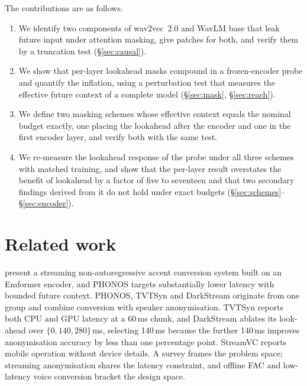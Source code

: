 \documentclass[preprint,12pt,authoryear]{elsarticle}
\begin{document}
The contributions are as follows.
\begin{enumerate}\itemsep1pt
\item We identify two components of wav2vec~2.0 and WavLM base that leak future
      input under attention masking, give patches for both, and verify them by
      a truncation test (\S\ref{sec:causal}).
\item We show that per-layer lookahead masks compound in a frozen-encoder
      probe and quantify the inflation, using a perturbation test that
      measures the effective future context of a complete model
      (\S\ref{sec:mask}, \S\ref{sec:reach}).
\item We define two masking schemes whose effective context equals the
      nominal budget exactly, one placing the lookahead after the encoder and
      one in the first encoder layer, and verify both with the same test.
\item We re-measure the lookahead response of the probe under all three
      schemes with matched training, and show that the per-layer result
      overstates the benefit of lookahead by a factor of five to seventeen
      and that two secondary findings derived from it do not hold under exact
      budgets (\S\ref{sec:schemes}--\S\ref{sec:encoder}).
\end{enumerate}

\section{Related work}

\citet{nguyen2025streaming} present a streaming
non-autoregressive accent conversion system built on an Emformer encoder, and
PHONOS \citep{phonos2026} targets substantially lower latency with bounded
future context. PHONOS, TVTSyn \citep{tvtsyn2026} and
DarkStream \citep{darkstream2025} originate from one group and combine
conversion with speaker anonymisation. TVTSyn reports both CPU and GPU latency
at a 60\,ms chunk, and DarkStream ablates its look-ahead over
$\{0, 140, 280\}$\,ms, selecting 140\,ms because the further 140\,ms improves
anonymisation accuracy by less than one percentage point.
StreamVC \citep{streamvc2024} reports mobile operation without device details.
A survey \citep{acsurvey2026} frames the problem space; streaming
anonymisation \citep{streamvoiceanon2026, streamvoiceanonplus2026, e2eanon2024}
shares the latency constraint, and offline FAC \citep{zhao2021fac,
accentron2022} and low-latency voice conversion \citep{llvc2023} bracket the
design space.
\end{document}
